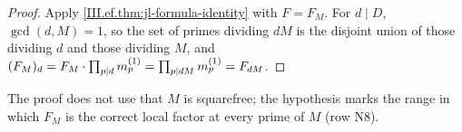 \begin{corollary}
\end{corollary}
\begin{proof}
Apply \cref{III.ef.thm:jl-formula-identity} with $F=F_M$. For $d\mid D$, $\gcd(d,M)=1$, so the set of primes dividing $dM$ is the disjoint union of
those dividing $d$ and those dividing $M$, and $(F_M)_d=F_M\cdot\prod_{p\mid d}m^{(1)}_p=\prod_{p\mid dM}m^{(1)}_p=F_{dM}$.
\end{proof}
\noindent The proof does not use that $M$ is squarefree; the hypothesis marks the range in which $F_M$ is the correct local factor at every prime
of $M$ (row N8).

